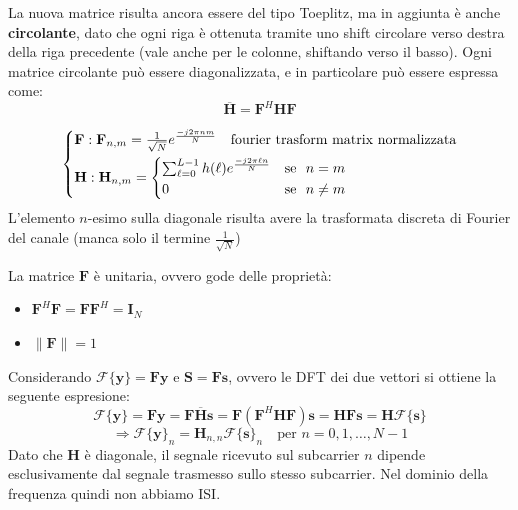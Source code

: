 La nuova matrice risulta ancora essere del tipo Toeplitz, ma in aggiunta è anche \textbf{circolante}, dato che ogni riga è ottenuta tramite uno shift circolare verso destra della riga precedente (vale anche per le colonne, shiftando verso il basso).
Ogni matrice circolante può essere diagonalizzata, e in particolare può essere espressa come:
\[
    \overline{\mathbf{H}} = \mathbf{F}^H \mathbf{H} \mathbf{F}
\]




\[
    \begin{cases*}
        \mathbf{F}: \mathbf{F}_{n, m} = \frac{1}{\sqrt{N}} e^{\frac{-j2\pi nm}{N}} \quad \text{fourier trasform matrix normalizzata} \\
        \mathbf{H}: \mathbf{H}_{n, m} = \begin{cases*}
                                                        \sum_{\ell=0}^{L-1} h(\ell) e^{\frac{-j2\pi \ell n}{N}} & \text{se } $n = m$ \\
                                                        0 & \text{se } $n \neq m$
                                                    \end{cases*}
    \end{cases*}
\]
L'elemento $n$-esimo sulla diagonale risulta avere la trasformata  discreta di Fourier del canale (manca solo il termine $\frac{1}{\sqrt{N}}$)


La matrice $\mathbf{F}$ è unitaria, ovvero gode delle proprietà:
\begin{itemize}
    \item $\mathbf{F}^H \mathbf{F} = \mathbf{F} \mathbf{F}^H = \mathbf{I}_N$
    \item $\| \mathbf{F} \| = 1$ 
\end{itemize}

Considerando $\mathcal{F}\{\mathbf{y}\} = \mathbf{F} \mathbf{y}$ e $\mathbf{S} = \mathbf{F} \mathbf{s}$, ovvero le DFT dei due vettori si ottiene la seguente espresione:
\[
    \mathcal{F}\{\mathbf{y}\} = \mathbf{F} \mathbf{y} = \mathbf{F} \mathbf{\overline{H}} \mathbf{s} = \mathbf{F} \left(\mathbf{F}^H \mathbf{H} \mathbf{F}\right)\mathbf{s} =  \mathbf{H} \mathbf{F} \mathbf{s} = \mathbf{H} \mathcal{F}\{\mathbf{s}\}
\]
\[
    \Rightarrow \mathcal{F}\{\mathbf{y}\}_{n} = \mathbf{H}_{n,n} \mathcal{F}\{\mathbf{s}\}_{n} \quad \text{per } n = 0, 1, \ldots, N-1
\]
Dato che $\mathbf{H}$ è diagonale, il segnale ricevuto sul subcarrier $n$ dipende esclusivamente dal segnale trasmesso sullo stesso subcarrier. Nel dominio della frequenza quindi non abbiamo ISI.


